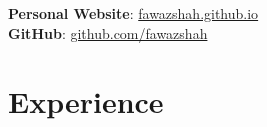\documentclass[11pt,a4paper,sans]{moderncv}        %
\begin{document}
\maketitle

\vspace{-50pt}

\begin{center}
\textbf{Personal Website}: \href{https://fawazshah.github.io/}{fawazshah.github.io} \\
\textbf{GitHub}: \href{https://github.com/fawazshah/}{github.com/fawazshah}
\end{center}

\section{Experience}
\end{document}
